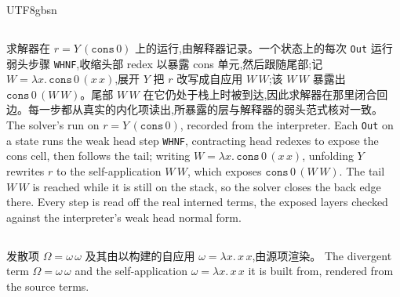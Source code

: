 \begin{CJK*}{UTF8}{gbsn}
  \subsection{}\label{app:cyclic-zeros-trace}
  \ifTablambdaChinese
  求解器在 $r = Y\,(\mathtt{cons}\,0)$ 上的运行,由解释器记录。一个状态上的每次 \texttt{Out} 运行弱头步骤 \texttt{WHNF},收缩头部 redex 以暴露 cons 单元,然后跟随尾部;记 $W = \lambda x.\,\mathtt{cons}\,0\,(x\,x)$,展开 $Y$ 把 $r$ 改写成自应用 $W\,W$;该 $W\,W$ 暴露出 $\mathtt{cons}\,0\,(W\,W)$。尾部 $W\,W$ 在它仍处于栈上时被到达,因此求解器在那里闭合回边。每一步都从真实的内化项读出,所暴露的层与解释器的弱头范式核对一致。
  \else
  The solver's run on $r = Y\,(\mathtt{cons}\,0)$, recorded from the interpreter. Each \texttt{Out} on a state runs the weak head step \texttt{WHNF}, contracting head redexes to expose the cons cell, then follows the tail; writing $W = \lambda x.\,\mathtt{cons}\,0\,(x\,x)$, unfolding $Y$ rewrites $r$ to the self-application $W\,W$, which exposes $\mathtt{cons}\,0\,(W\,W)$. The tail $W\,W$ is reached while it is still on the stack, so the solver closes the back edge there. Every step is read off the real interned terms, the exposed layers checked against the interpreter's weak head normal form.
  \fi
  

  \subsection{}\label{app:omega-code}
  \ifTablambdaChinese
  发散项 $\Omega = \omega\,\omega$ 及其由以构建的自应用 $\omega = \lambda x.\,x\,x$,由源项渲染。
  \else
  The divergent term $\Omega = \omega\,\omega$ and the self-application $\omega = \lambda x.\,x\,x$ it is built from, rendered from the source terms.
  \fi
  


\end{CJK*}
